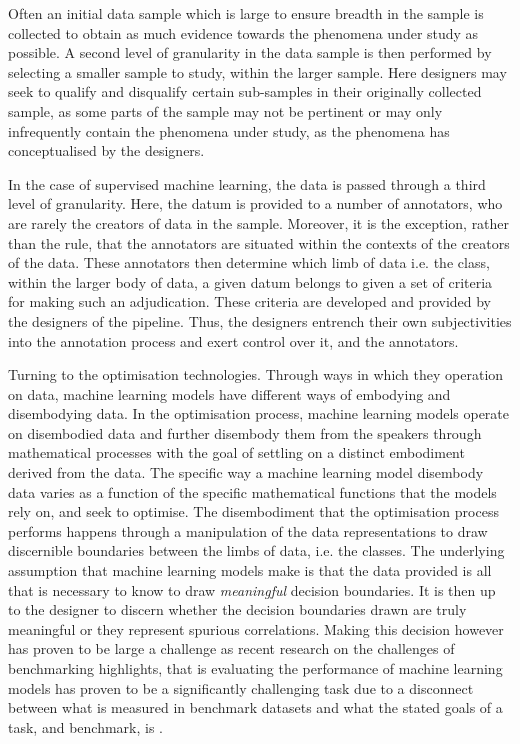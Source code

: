 {Often an initial data sample which is large to ensure breadth in the sample is collected to obtain as much evidence towards the phenomena under study as possible.
A second level of granularity in the data sample is then performed by selecting a smaller sample to study, within the larger sample.
Here designers may seek to qualify and disqualify certain sub-samples in their originally collected sample, as some parts of the sample may not be pertinent or may only infrequently contain the phenomena under study, as the phenomena has conceptualised by the designers.

In the case of supervised machine learning, the data is passed through a third level of granularity.
Here, the datum is provided to a number of annotators, who are rarely the creators of data in the sample.
Moreover, it is the exception, rather than the rule, that the annotators are situated within the contexts of the creators of the data.
These annotators then determine which limb of data i.e. the class, within the larger body of data, a given datum belongs to given a set of criteria for making such an adjudication.
These criteria are developed and provided by the designers of the pipeline.
Thus, the designers entrench their own subjectivities into the annotation process and exert control over it, and the annotators.

Turning to the optimisation technologies.
Through ways in which they operation on data, machine learning models have different ways of embodying and disembodying data.
In the optimisation process, machine learning models operate on disembodied data and further disembody them from the speakers through mathematical processes with the goal of settling on a distinct embodiment derived from the data.
The specific way a machine learning model disembody data varies as a function of the specific mathematical functions that the models rely on, and seek to optimise.
The disembodiment that the optimisation process performs happens through a manipulation of the data representations to draw discernible boundaries between the limbs of data, i.e. the classes.
The underlying assumption that machine learning models make is that the data provided is all that is necessary to know to draw \textit{meaningful} decision boundaries.
It is then up to the designer to discern whether the decision boundaries drawn are truly meaningful or they represent spurious correlations.
Making this decision however has proven to be large a challenge as recent research on the challenges of benchmarking highlights, that is evaluating the performance of machine learning models has proven to be a significantly challenging task due to a disconnect between what is measured in benchmark datasets and what the stated goals of a task, and benchmark, is \citep{Kiela_2021,Bowman_2021}.

}
